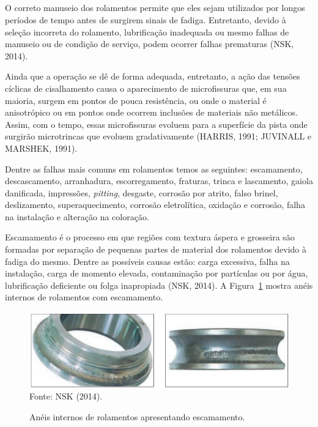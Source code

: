 \documentclass[
	12pt,				
	oneside,			
	a4paper,			
	english,			
	brazil,			
	]{abntex2ppgsi}
\begin{document}
\subsection{}

O correto manuseio dos rolamentos permite que eles sejam utilizados por longos períodos de tempo antes de surgirem sinais de fadiga. Entretanto, devido à seleção incorreta do rolamento, lubrificação inadequada ou mesmo falhas de manuseio ou de condição de serviço, podem ocorrer falhas prematuras (NSK, 2014).

Ainda que a operação se dê de forma adequada, entretanto, a ação das tensões cíclicas de cisalhamento causa o aparecimento de microfissuras que, em sua maioria, surgem em pontos de pouca resistência, ou onde o material é anisotrópico  ou em pontos onde ocorrem inclusões de materiais não metálicos. Assim, com o tempo, essas microfissuras evoluem para a superfície da pista onde surgirão microtrincas que evoluem gradativamente (HARRIS, 1991; JUVINALL e MARSHEK, 1991).

Dentre as falhas mais comuns em rolamentos temos as seguintes: escamamento, descascamento, arranhadura, escorregamento, fraturas, trinca e lascamento, gaiola danificada, impressões, \textit{pitting}, desgaste, corrosão por atrito, falso brinel, deslizamento, superaquecimento, corrosão eletrolítica, oxidação e corrosão, falha na instalação e alteração na coloração.

Escamamento é o processo em que regiões com textura áspera e grosseira são formadas por separação de pequenas partes de material dos rolamentos devido à fadiga do mesmo. Dentre as possíveis causas estão: carga excessiva, falha na instalação, carga de momento elevada, contaminação por partículas ou por água, lubrificação deficiente ou folga inapropiada (NSK, 2014). A Figura~\ref{escamemento_nsk} mostra anéis internos de rolamentos com escamamento. 

\begin{figure}[H]
\centering
\caption {Anéis internos de rolamentos apresentando escamamento.}
\includegraphics[width=\textwidth,height=\textheight,keepaspectratio]{escamamento_nsk} \\
Fonte: NSK (2014).
\label{escamemento_nsk}
\end{figure}
\end{document}
